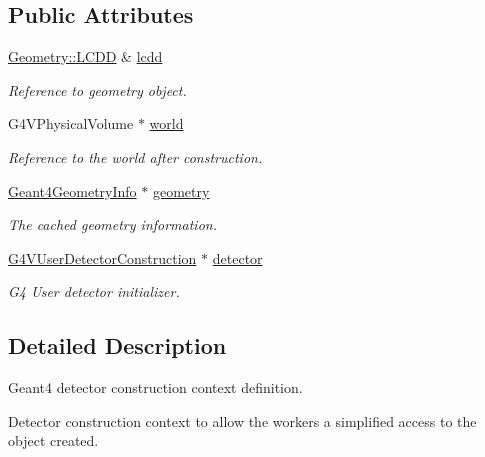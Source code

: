 \subsection*{Public Attributes}
\begin{DoxyCompactItemize}
\item 
\hyperlink{class_d_d4hep_1_1_geometry_1_1_l_c_d_d}{Geometry\+::\+L\+C\+DD} \& \hyperlink{class_d_d4hep_1_1_simulation_1_1_geant4_detector_construction_context_a39ab0e51872f7ce4974d7f1784af251e}{lcdd}
\begin{DoxyCompactList}\small\item\em Reference to geometry object. \end{DoxyCompactList}\item 
G4\+V\+Physical\+Volume $\ast$ \hyperlink{class_d_d4hep_1_1_simulation_1_1_geant4_detector_construction_context_a532857c4548770776adf8f94db5e5e56}{world}
\begin{DoxyCompactList}\small\item\em Reference to the world after construction. \end{DoxyCompactList}\item 
\hyperlink{class_d_d4hep_1_1_simulation_1_1_geant4_geometry_info}{Geant4\+Geometry\+Info} $\ast$ \hyperlink{class_d_d4hep_1_1_simulation_1_1_geant4_detector_construction_context_a6da3039365bc44c54314ff0d51cfc655}{geometry}
\begin{DoxyCompactList}\small\item\em The cached geometry information. \end{DoxyCompactList}\item 
\hyperlink{class_g4_v_user_detector_construction}{G4\+V\+User\+Detector\+Construction} $\ast$ \hyperlink{class_d_d4hep_1_1_simulation_1_1_geant4_detector_construction_context_a0fc040cea931da95d99ec7d3aca2199d}{detector}
\begin{DoxyCompactList}\small\item\em G4 User detector initializer. \end{DoxyCompactList}\end{DoxyCompactItemize}


\subsection{Detailed Description}
Geant4 detector construction context definition. 

Detector construction context to allow the workers a simplified access to the object created.

